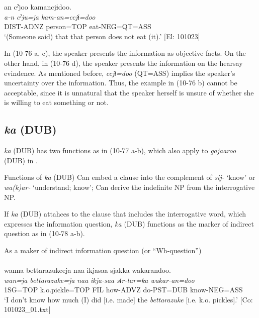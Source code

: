 \begin{xlist}
\begin{xlist}
  \ex  %
      \glll     an  cˀjoo  kamancjɨdoo.\\
      \textit{a-n}  \textit{cˀju=ja}  \textit{kam-an=ccjɨ=doo}\\
      DIST-ADNZ  person=TOP  eat-NEG=QT=ASS\\
      \glt        ‘(Someone said) that that person does not eat (it).’ [El: 101023]
    \end{xlist}
\z

In (10-76 a, c), the speaker presents the information as objective facts. On the other hand, in (10-76 d), the speaker presents the information on the hearsay evindence. As mentioned before, \textit{ccjɨ=doo} (QT=ASS) implies the speaker’s uncertainty over the information. Thus, the example in (10-76 b) cannot be acceptable, since it is unnatural that the speaker herself is unsure of whether she is willing to eat something or not.

\subsection{\textit{ka} (DUB)}\label{sec:10.4.2}

\textit{ka} (DUB) has two functions as in (10-77 a-b), which also apply to \textit{gajaaroo} (DUB) in .

\ea\label{ex:10.77} Functions of \textit{ka} (DUB)
 \ea Can embed a clause into the complement of \textit{sij-} ‘know’ or \textit{wa(k)ar-} ‘understand; know’;
 \ex Can derive the indefinite NP from the interrogative NP.
 \z
\z

If \textit{ka} (DUB) attahces to the clause that includes the interrogative word, which expresses the information question, \textit{ka} (DUB) functions as the marker of indirect question as in (10-78 a-b).

\ea\label{ex:10.78}   As a maker of indirect information question (or “Wh-question”)\\
  \ea\relax  [= (5-38 a)]\\
      \glll    wanna  {\textbar}bettarazukee{\textbar}ja  naa  ikjasaa  sjakka  wakarandoo.\\
      \textit{wan=ja}  \textit{bettarazuke=ja}  \textit{naa}  \textit{ikja-saa}  \textit{sɨr-tar=ka}  \textit{wakar-an=doo}\\
      1SG=TOP  k.o.pickle=TOP  FIL  how-ADVZ  do-PST=DUB  know-NEG=ASS\\
      \glt       ‘I don’t know how much (I) did [i.e. made] the \textit{bettarazuke} [i.e. k.o. pickles].’ [Co: 101023\_01.txt]


\end{xlist}
